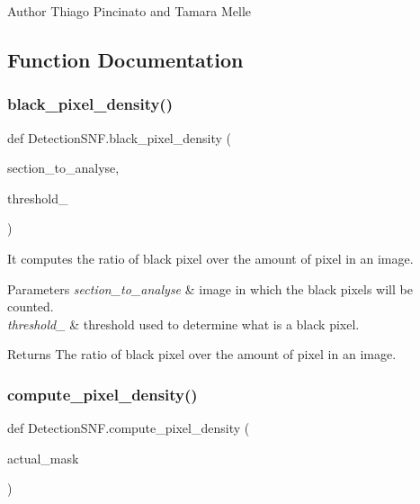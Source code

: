 \begin{DoxyAuthor}{Author}
Thiago Pincinato and Tamara Melle 
\end{DoxyAuthor}


\subsection{Function Documentation}
\mbox{\label{namespaceDetectionSNF_a4c61799b0b302792b11c396a63a39d11}} 
\subsubsection{\texorpdfstring{black\+\_\+pixel\+\_\+density()}{black\_pixel\_density()}}
{\footnotesize\ttfamily def Detection\+S\+N\+F.\+black\+\_\+pixel\+\_\+density (\begin{DoxyParamCaption}\item[{}]{section\+\_\+to\+\_\+analyse,  }\item[{}]{threshold\+\_\+ }\end{DoxyParamCaption})}



It computes the ratio of black pixel over the amount of pixel in an image. 


\begin{DoxyParams}{Parameters}
{\em section\+\_\+to\+\_\+analyse} & image in which the black pixels will be counted. \\
\hline
{\em threshold\+\_\+} & threshold used to determine what is a black pixel. \\
\hline
\end{DoxyParams}
\begin{DoxyReturn}{Returns}
The ratio of black pixel over the amount of pixel in an image. 
\end{DoxyReturn}
\mbox{\label{namespaceDetectionSNF_a236f312523023cd5810fcdfcab35c2be}} 
\subsubsection{\texorpdfstring{compute\+\_\+pixel\+\_\+density()}{compute\_pixel\_density()}}
{\footnotesize\ttfamily def Detection\+S\+N\+F.\+compute\+\_\+pixel\+\_\+density (\begin{DoxyParamCaption}\item[{}]{actual\+\_\+mask }\end{DoxyParamCaption})}



